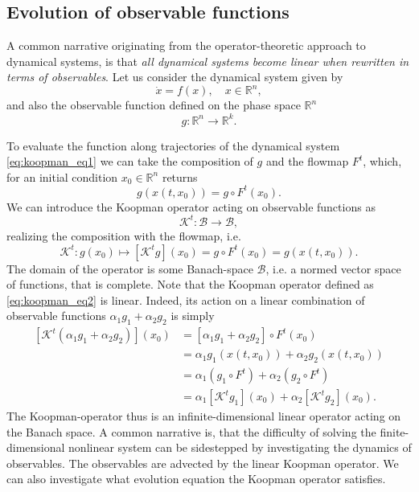 \subsection{Evolution of observable functions}
A common narrative originating from the operator-theoretic approach to dynamical systems, is that {\em all dynamical systems become linear when rewritten in terms of observables}. Let us consider the dynamical system given by 
\begin{equation}
\label{eq:koopman_eq1}
\dot{x} = f(x), \quad x\in \mathbb{R}^n,
\end{equation}
and also the observable function defined on the phase space $\mathbb{R}^n$
\begin{equation}
g : \mathbb{R}^n\to \mathbb{R}^k.
\end{equation}

To evaluate the function along trajectories of the dynamical system \eqref{eq:koopman_eq1} we can take the composition of $g$ and the flowmap $F^t$, which, for an initial condition $x_0\in \mathbb{R}^n$ returns
\begin{equation}
g\left(x(t, x_0)\right) = g \circ F^t(x_0).
\end{equation}
We can introduce the Koopman operator acting on observable functions as 
\begin{equation}
\mathcal{K}^t : \mathcal{B} \to \mathcal{B},
\end{equation}
realizing the composition with the flowmap, i.e. 
\begin{equation}
\label{eq:koopman_eq2}
\mathcal{K}^t: g(x_0) \mapsto \left[\mathcal{K}^t g\right](x_0) = g\circ F^t(x_0) = g(x(t,x_0)).
\end{equation} 
The domain of the operator is some Banach-space $\mathcal{B}$, i.e. a normed vector space of functions, that is complete. 
Note that the Koopman operator defined as \eqref{eq:koopman_eq2} is linear. Indeed, its action on a linear combination of observable functions $\alpha_1 g_1 + \alpha_2 g_2$ is simply
\begin{align}
\left[\mathcal{K}^t(\alpha_1 g_1 + \alpha_2 g_2)\right](x_0) &= [\alpha_1 g_1 + \alpha_2 g_2]\circ F^t(x_0) \\
 &= \alpha_1 g_1(x(t,x_0)) + \alpha_2 g_2(x(t,x_0)) \\
 & = \alpha_1(g_1 \circ F^t) + \alpha_2 (g_2 \circ F^t) \\
 & = \alpha_1 \left[\mathcal{K}^tg_1\right](x_0) + \alpha_2 \left[\mathcal{K}^tg_2\right](x_0).
\end{align}
The Koopman-operator thus is an infinite-dimensional linear operator acting on the Banach space. A common narrative is, that the difficulty of solving the finite-dimensional nonlinear system can be sidestepped by investigating the dynamics of observables. The observables are advected by the linear Koopman operator. We can also investigate what evolution equation the Koopman operator satisfies. 

